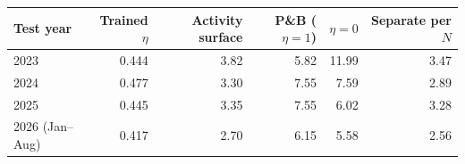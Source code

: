 \begin{tabular}{lrrrrr}
\toprule
Test year & Trained \(\eta\) & Activity surface & P\&B (\(\eta=1\)) & \(\eta=0\) & Separate per \(N\) \\
\midrule
2023 & 0.444 & 3.82 & 5.82 & 11.99 & 3.47 \\
2024 & 0.477 & 3.30 & 7.55 & 7.59 & 2.89 \\
2025 & 0.445 & 3.35 & 7.55 & 6.02 & 3.28 \\
2026 (Jan--Aug) & 0.417 & 2.70 & 6.15 & 5.58 & 2.56 \\
\bottomrule
\end{tabular}
